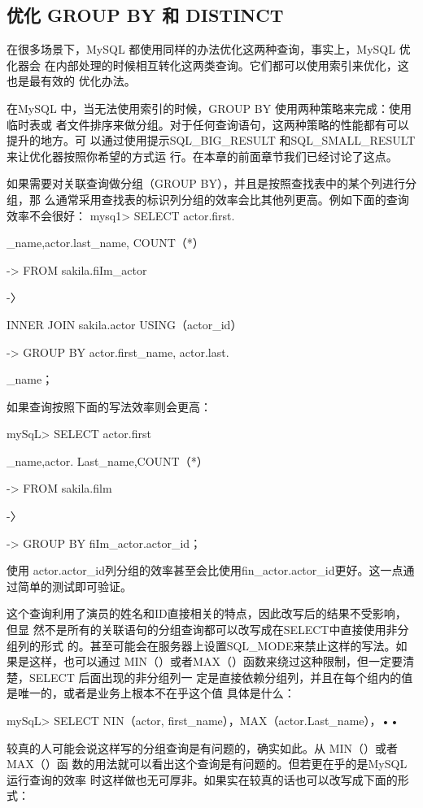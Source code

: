 \subsection{优化 GROUP BY 和 DISTINCT}
在很多场景下，MySQL 都使用同样的办法优化这两种查询，事实上，MySQL 优化器会
在内部处理的时候相互转化这两类查询。它们都可以使用索引来优化，这也是最有效的
优化办法。

在MySQL 中，当无法使用索引的时候，GROUP BY 使用两种策略来完成：使用临时表或
者文件排序来做分组。对于任何查询语句，这两种策略的性能都有可以提升的地方。可
以通过使用提示SQL\_BIG\_RESULT 和SQL\_SMALL\_RESULT来让优化器按照你希望的方式运
行。在本章的前面章节我们已经讨论了这点。

如果需要对关联查询做分组（GROUP BY），并且是按照查找表中的某个列进行分组，那
么通常采用查找表的标识列分组的效率会比其他列更高。例如下面的查询效率不会很好：
mysq1> SELECT actor.first.

\_name,actor.last\_name, COUNT（*）

-> FROM sakila.fiIm\_actor

-〉

INNER JOIN sakila.actor USING（actor\_id）

-> GROUP BY actor.first\_name, actor.last.

\_name；

如果查询按照下面的写法效率则会更高：

mySqL> SELECT actor.first

\_name,actor. Last\_name,COUNT（*）

-> FROM sakila.film

-〉

-> GROUP BY fiIm\_actor.actor\_id；

使用 actor.actor\_id列分组的效率甚至会比使用fin\_actor.actor\_id更好。这一点通
过简单的测试即可验证。

这个查询利用了演员的姓名和ID直接相关的特点，因此改写后的结果不受影响，但显
然不是所有的关联语句的分组查询都可以改写成在SELECT中直接使用非分组列的形式
的。甚至可能会在服务器上设置SQL\_MODE来禁止这样的写法。如果是这样，也可以通过
MIN（）或者MAX（）函数来绕过这种限制，但一定要清楚，SELECT 后面出现的非分组列一
定是直接依赖分组列，并且在每个组内的值是唯一的，或者是业务上根本不在乎这个值
具体是什么：

mySqL> SELECT NIN（actor, first\_name），MAX（actor.Last\_name），••

较真的人可能会说这样写的分组查询是有问题的，确实如此。从 MIN（）或者 MAX（）函
数的用法就可以看出这个查询是有问题的。但若更在乎的是MySQL 运行查询的效率
时这样做也无可厚非。如果实在较真的话也可以改写成下面的形式：

